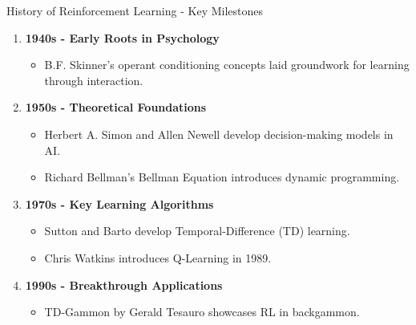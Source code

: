 \documentclass[aspectratio=169]{beamer}
\begin{document}
\begin{frame}[fragile]{History of Reinforcement Learning - Key Milestones}
  \begin{enumerate}
    \item \textbf{1940s - Early Roots in Psychology}
      \begin{itemize}
        \item B.F. Skinner's operant conditioning concepts laid groundwork for learning through interaction.
      \end{itemize}

    \item \textbf{1950s - Theoretical Foundations}
      \begin{itemize}
        \item Herbert A. Simon and Allen Newell develop decision-making models in AI.
        \item Richard Bellman's Bellman Equation introduces dynamic programming.
      \end{itemize}

    \item \textbf{1970s - Key Learning Algorithms}
      \begin{itemize}
        \item Sutton and Barto develop Temporal-Difference (TD) learning.
        \item Chris Watkins introduces Q-Learning in 1989.
      \end{itemize}

    \item \textbf{1990s - Breakthrough Applications}
      \begin{itemize}
        \item TD-Gammon by Gerald Tesauro showcases RL in backgammon.
      \end{itemize}
  \end{enumerate}
\end{frame}
\end{document}
